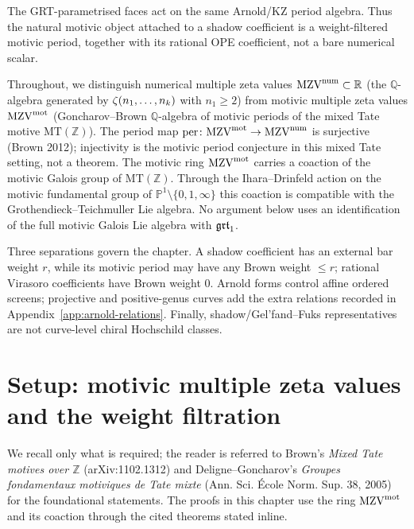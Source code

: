 The GRT-parametrised faces act on the same Arnold/KZ period algebra.
Thus the natural motivic object attached to a shadow coefficient is a
weight-filtered motivic period, together with its rational OPE
coefficient, not a bare numerical scalar.

Throughout, we distinguish numerical multiple zeta values
$\mathrm{MZV}^{\mathrm{num}} \subset \mathbb{R}$ (the $\mathbb{Q}$-algebra generated
by $\zeta(n_1, \ldots, n_k)$ with $n_1 \geq 2$) from motivic
multiple zeta values $\mathrm{MZV}^{\mathrm{mot}}$ (Goncharov--Brown
$\mathbb{Q}$-algebra of motivic periods of the mixed Tate motive
$\mathrm{MT}(\mathbb{Z})$). The period map
$\mathrm{per} \colon \mathrm{MZV}^{\mathrm{mot}} \to \mathrm{MZV}^{\mathrm{num}}$ is surjective (Brown
2012); injectivity is the motivic period conjecture in this mixed Tate
setting, not a theorem. The motivic ring $\mathrm{MZV}^{\mathrm{mot}}$ carries a
coaction of the motivic Galois group of
$\mathrm{MT}(\mathbb{Z})$. Through the Ihara--Drinfeld action on the
motivic fundamental group of
$\mathbb P^1\setminus\{0,1,\infty\}$ this coaction is compatible with
the Grothendieck--Teichmuller Lie algebra. No argument below uses an
identification of the full motivic Galois Lie algebra with $\mathfrak{grt}_1$.

Three separations govern the chapter. A shadow coefficient has an
external bar weight $r$, while its motivic period may have any Brown
weight $\leq r$; rational Virasoro coefficients have Brown weight $0$.
Arnold forms control affine ordered screens; projective and
positive-genus curves add the extra relations recorded in
Appendix~\ref{app:arnold-relations}. Finally, shadow/Gel'fand--Fuks
representatives are not curve-level chiral Hochschild classes.

\section{Setup: motivic multiple zeta values and the weight filtration}
\label{sec:mot-setup}

We recall only what is required; the reader is referred to
Brown's \emph{Mixed Tate motives over $\mathbb{Z}$}
(arXiv:1102.1312) and Deligne--Goncharov's \emph{Groupes
fondamentaux motiviques de Tate mixte} (Ann. Sci. \'Ecole Norm.
Sup. 38, 2005) for the foundational statements. The proofs in this
chapter use the ring $\mathrm{MZV}^{\mathrm{mot}}$ and its coaction through the cited
theorems stated inline.

